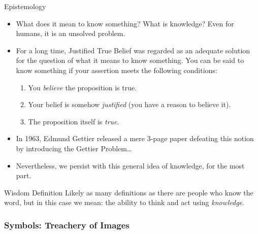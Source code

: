 \documentclass[aspectratio=169]{beamer} %
\begin{document}
\begin{frame}{Epistemology}
  \begin{itemize}
    \item What does it mean to know something? What is knowledge? Even for humans, it is an unsolved
    problem.
    \item For a long time, Justified True Belief was regarded as an adequate
    solution for the question of what it means to know something. You can be said
    to know something if your assertion meets the following conditions:
    \begin{enumerate}
      \item You \emph{believe} the proposition is true.
      \item Your belief is somehow \emph{justified} (you have a reason to believe
      it).
      \item The proposition itself is \emph{true}.
    \end{enumerate}
    \item In 1963, Edmund Gettier released a mere 3-page paper defeating this notion by
    introducing the Gettier Problem\ldots
    \item Nevertheless, we persist with this general idea of knowledge, for the
    most part.
  \end{itemize}
\end{frame}

\begin{frame}{Wisdom Definition}
\large{Likely as many definitions as there are people who know the word, but in
this case we mean: the ability to think and act using \emph{knowledge}.}

\end{frame}

\begin{frame}
\frametitle{Symbols: Treachery of Images}

\end{frame}
\end{document}
